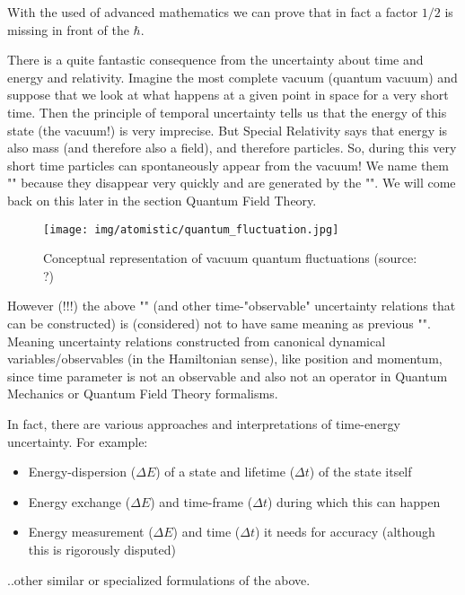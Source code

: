 \begin{enumerate}
		\begin{tcolorbox}[title=Remark,colframe=black,arc=10pt]
		With the used of advanced mathematics we can prove that in fact a factor $1/2$ is missing in front of the $\hbar$.
		\end{tcolorbox}
		There is a quite fantastic consequence from the uncertainty about time and energy and relativity. Imagine the most complete vacuum (quantum vacuum) and suppose that we look at what happens at a given point in space for a very short time. Then the principle of temporal uncertainty tells us that the energy of this state (the vacuum!) is very imprecise. But Special Relativity says that energy is also mass (and therefore also a field), and therefore particles. So, during this very short time particles can spontaneously appear from the vacuum! We name them "" because they disappear very quickly and are generated by the "". We will come back on this later in the section Quantum Field Theory.
		\begin{figure}[H]
			\centering
			\texttt{[image: img/atomistic/quantum\_fluctuation.jpg]}
			\caption{Conceptual representation of vacuum quantum fluctuations (source: ?)}
		\end{figure}
		However (!!!) the above "" (and other time-"observable" uncertainty relations that can be constructed) is (considered) not to have same meaning as previous "". Meaning uncertainty relations constructed from canonical dynamical variables/observables (in the Hamiltonian sense), like position and momentum, since time parameter is not an observable and also not an operator in Quantum Mechanics or Quantum Field Theory formalisms.
	
		In fact, there are various approaches and interpretations of time-energy uncertainty. For example:
		\begin{itemize}
			\item Energy-dispersion ($\Delta E$) of a state and lifetime ($\Delta t$) of the state itself
			\item Energy exchange ($\Delta E$) and time-frame ($\Delta t$) during which this can happen
			\item Energy measurement ($\Delta E$) and time ($\Delta t$) it needs for accuracy (although this is rigorously disputed)
		\end{itemize}
		..other similar or specialized formulations of the above.
		

\end{enumerate}

